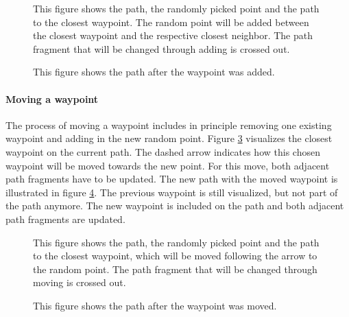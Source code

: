 	\begin{figure}[H]
		\centering
		
		\caption{This figure shows the path, the randomly picked point and the path to the closest waypoint.
			The random point will be added between the closest waypoint and the respective closest neighbor.
			The path fragment that will be changed through adding is crossed out.}
		\label{fig:shortestPathAndAdd}
	\end{figure}
	\begin{figure}[H]
		\centering
		
		\caption{This figure shows the path after the waypoint was added.}
		\label{fig:shortestPathAndAddDone}
	\end{figure}
	

\paragraph{Moving a waypoint}	
The process of moving a waypoint includes in principle removing one existing waypoint and adding in the new random point. 
Figure \ref{fig:shortestPahtAndMove} visualizes the closest waypoint on the current path.
The dashed arrow indicates how this chosen waypoint will be moved towards the new point.
For this move, both adjacent path fragments have to be updated.
The new path with the moved waypoint is illustrated in figure \ref{fig:shortestPathAndMoveDone}.
The previous waypoint is still visualized, but not part of the path anymore.
The new waypoint is included on the path and both adjacent path fragments are updated.
	
	
	\begin{figure}[H]
		\centering
		
		\caption{This figure shows the path, the randomly picked point and the path to the closest waypoint, which will be moved following the arrow to the random point.
			The path fragment that will be changed through moving is crossed out.}
		\label{fig:shortestPahtAndMove}
	\end{figure}
	\begin{figure}[H]
		\centering
		
		\caption{This figure shows the path after the waypoint was moved.}
		\label{fig:shortestPathAndMoveDone}
	\end{figure}
	

